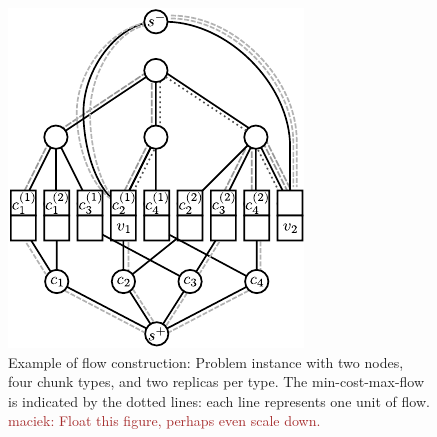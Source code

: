 \documentclass[9pt]{sigcomm-alternate}
\newcommand{\maciek}[1]{\textcolor{brown}{maciek: #1}}
\begin{document}
\begin{figure}
\includegraphics[width=\columnwidth]{figs/flow_ma_cv}
\caption{Example of flow construction: Problem instance with two nodes, four chunk
types, and two replicas per type. The min-cost-max-flow
is indicated by the dotted lines: each line represents one unit of flow.
\maciek{Float this figure, perhaps even scale down.}
}
\label{fig:flow_construction}
\end{figure}
\end{document}

